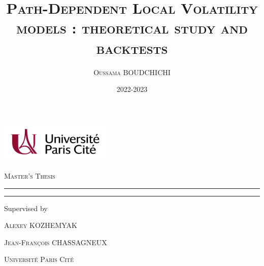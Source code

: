\documentclass[a4paper,12pt, openright]{report}
\title{\textsc{Path-Dependent Local Volatility models : theoretical study and backtests} }
\author{ \textsc{Oussama BOUDCHICHI}}
\date{2022-2023}
\makeatletter
\def\vhrulefill#1{\leavevmode\leaders\hrule\@height#1\hfill \kern\z@}
\numberwithin{equation}{section}
\numberwithin{equation}{section}
\newcommand{\1}{\mathbbm{1}}
\theoremstyle{mystyle}
\makeatother
\begin{document}
{}

\makeatletter

  \begin{titlepage}
	\centering
	\includegraphics[width=0.4\textwidth]{UniversiteParisCite_logo_horizontal_couleur_CMJN}
  \hfill
  
	\par\vspace{3cm}
	{\scshape\Large Master's Thesis \par}
	
	\vspace{2cm}
            \hspace{0.02\paperwidth}\textcolor{pc}{\vhrulefill{2pt}}\hspace{0.02\paperwidth}

            \vspace*{0.6cm}
		{\huge \@title \par}
            \vspace*{0.6cm} \hspace{0.02\paperwidth}\textcolor{pc}{\vhrulefill{2pt}}\hspace{0.02\paperwidth}
	\vspace{1cm}
        
	{\LARGE \@author \par}
 
	\vspace{2cm}
	{\large Supervised by \par
        \textsc{Alexey KOZHEMYAK}\par
	\textsc{Jean-François CHASSAGNEUX}\par}
	\vspace{2cm}
	{\large \@date\par}
	\vspace{2cm}
	{\scshape\Large Université Paris Cité \par}
	\vfill
\end{titlepage}  
\makeatother
\restoregeometry
\end{document}
